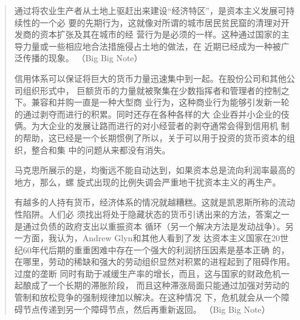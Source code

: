\begin{quotation}
通过将农业生产者从土地上驱赶出来建设“经济特区”，是资本主义发展可持续性的一个必
要的先期行为，这就像对所谓的城市居民贫民窟的清理对开发商的资本扩张及其在城市的经
营行为是必须的一样。这种通过国家的主导力量或一些相应地合法措施侵占土地的做法，在
近期已经成为一种被广泛传播的现象。 （Big Big Note）

信用体系可以保证将巨大的货币力量迅速集中到一起。在股份公司和其他公司组织形式中，
巨额货币的力量就被聚集在少数指挥者和管理者的控制之下。兼容和并购一直是一种大型商
业行为，这种商业行为能够引发新一轮的通过剥夺而进行的积累。同时还存在各种各样的大
企业吞并小企业的伎俩。为大企业的发展让路而进行的对小经营者的剥夺通常会得到信用机
制的帮助，这已经是一个长期惯例了所以，关于可以用于投资的货币资本的组织，整合和集
中的问题从来都没有消失。 

马克思所展示的是，均衡远不能自动达到，如果资本总是流向利润率最高的地方，那么，螺
旋式出现的比例失调会严重地干扰资本主义的再生产。

有越多的人持有货币，经济体系的情况就越糟糕。这就是凯恩斯所称的流动性陷阱。人们必
须找出将处于隐藏状态的货币引诱出来的方法，答案之一是通过负债的政府支出以重振资本
循环（另一个解决方法是发动战争）。另一方面，我认为，Andrew Glyn和其他人看到了发
达资本主义国家在20世纪60年代后期的重重困难中存在一个强大的利润挤压因素是基本正确
的，在哪里，劳动的稀缺和强大的劳动组织显然对积累的进程起到了阻碍作用。过度的垄断
同时有助于减缓生产率的增长，而且，这与国家的财政危机一起酿成了一个长期的滞胀阶段，
而且这种滞涨局面只能通过加强对劳动的管制和放松竞争的强制规律加以解决。在这种情况
下，危机就会从一个障碍节点传递到另一个障碍节点，然后再重新返回。
 （Big Big Note）

\end{quotation}


